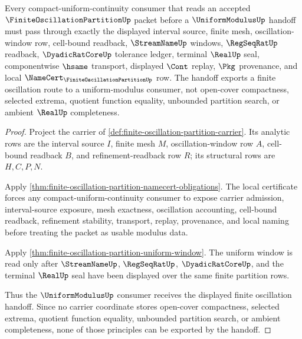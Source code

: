 \begin{theorem}
\label{thm:finite-oscillation-partition-uniform-modulus-handoff}
Every compact-uniform-continuity consumer that reads an accepted $\FiniteOscillationPartitionUp$ packet before a $\UniformModulusUp$ handoff must pass through exactly the displayed interval source, finite mesh, oscillation-window row, cell-bound readback, $\StreamNameUp$ windows, $\RegSeqRatUp$ readback, $\DyadicRatCoreUp$ tolerance ledger, terminal $\RealUp$ seal, componentwise $\hsame$ transport, displayed $\Cont$ replay, $\Pkg$ provenance, and local $\NameCert_{\FiniteOscillationPartitionUp}$ row. The handoff exports a finite oscillation route to a uniform-modulus consumer, not open-cover compactness, selected extrema, quotient function equality, unbounded partition search, or ambient $\RealUp$ completeness.
\end{theorem}
\begin{proof}
Project the carrier of \autoref{def:finite-oscillation-partition-carrier}. Its analytic rows are the interval source $I$, finite mesh $M$, oscillation-window row $A$, cell-bound readback $B$, and refinement-readback row $R$; its structural rows are $H,C,P,N$.

Apply \autoref{thm:finite-oscillation-partition-namecert-obligations}. The local certificate forces any compact-uniform-continuity consumer to expose carrier admission, interval-source exposure, mesh exactness, oscillation accounting, cell-bound readback, refinement stability, transport, replay, provenance, and local naming before treating the packet as usable modulus data.

Apply \autoref{thm:finite-oscillation-partition-uniform-window}. The uniform window is read only after $\StreamNameUp$, $\RegSeqRatUp$, $\DyadicRatCoreUp$, and the terminal $\RealUp$ seal have been displayed over the same finite partition rows.

Thus the $\UniformModulusUp$ consumer receives the displayed finite oscillation handoff. Since no carrier coordinate stores open-cover compactness, selected extrema, quotient function equality, unbounded partition search, or ambient completeness, none of those principles can be exported by the handoff.
\end{proof}

